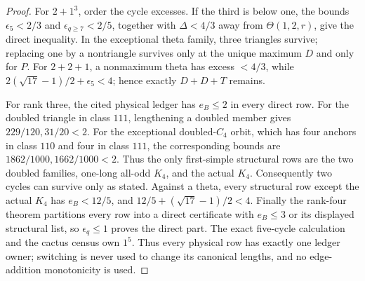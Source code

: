 \documentclass[11pt]{article}
\theoremstyle{remark}
\begin{document}
\begin{proof}
For $2+1^3$, order the cycle excesses.  If the third is below one, the bounds
$\epsilon_5<2/3$ and $\epsilon_{q\ge7}<2/5$, together with
$\Delta<4/3$ away from $\Theta(1,2,r)$, give the direct inequality.  In the
exceptional theta family, three triangles survive; replacing one by a
nontriangle survives only at the unique maximum $D$ and only for $P$.  For
$2+2+1$, a nonmaximum theta has excess $<4/3$, while
$2(\sqrt{17}-1)/2+\epsilon_5<4$; hence exactly $D+D+T$ remains.

For rank three, the cited physical ledger has $e_B\le2$ in every direct row.
For the doubled triangle in class $111$, lengthening a doubled member gives
$229/120,31/20<2$.  For the exceptional doubled-$C_4$ orbit, which has four
anchors in class $110$ and four in class $111$, the corresponding bounds are
$1862/1000,1662/1000<2$.  Thus the only first-simple structural rows are the
two doubled families, one-long all-odd $K_4$, and the actual $K_4$.
Consequently two cycles can survive only as stated.  Against a theta, every
structural row except the actual $K_4$ has $e_B<12/5$, and
$12/5+(\sqrt{17}-1)/2<4$.  Finally the rank-four theorem partitions every row
into a direct certificate with $e_B\le3$ or its displayed structural list, so
$\epsilon_q\le1$ proves the direct part.  The exact five-cycle calculation and
the cactus census own $1^5$.  Thus every physical row has exactly one ledger
owner; switching is never used to change its canonical lengths, and no
edge-addition monotonicity is used.
\end{proof}
\end{document}
